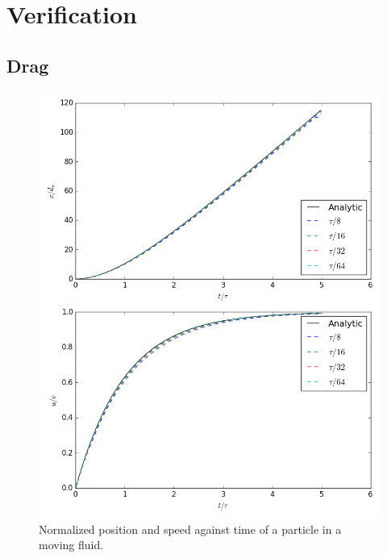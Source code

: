 \documentclass[10pt,a4paper,titlepage]{report}
\begin{document}
\section{Verification}
\label{sec:OpenCL verification}
\subsection{Drag}
\begin{figure}[!htb]
\centering
\includegraphics[scale=0.5]{figures/opencl_verification/drag_verification.png}
\caption{Normalized position and speed against time of a particle in a moving fluid.}
\label{fig:opencl_drag_verification}
\end{figure}
\end{document}
